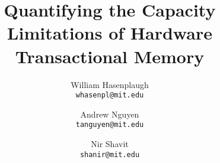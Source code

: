 \documentclass{article}
\author{
  William Hasenplaugh\\
  \texttt{whasenpl@mit.edu}
  \and
  Andrew Nguyen\\
  \texttt{tanguyen@mit.edu}
  \and
  Nir Shavit\\
  \texttt{shanir@mit.edu}
}
\title{Quantifying the Capacity Limitations of Hardware Transactional Memory}
\date{}
\begin{document}
\maketitle




%


\small
\end{document}
